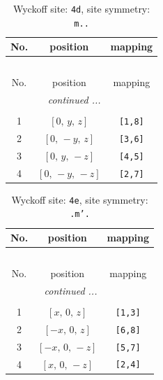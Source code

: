 \documentclass[fleqn,8pt]{jsarticle}
\begin{document}
\begin{longtable}{ccc}
\caption{Wyckoff site: {\tt 4d}, site symmetry: {\tt m..}}
 \\
 \hline \hline
No. & position & mapping \\ \hline \endfirsthead

\multicolumn{2}{l}{\tablename\ \thetable{}} \\
 \hline \hline
No. & position & mapping \\ \hline \endhead

 \hline \hline
\multicolumn{2}{r}{\footnotesize\it continued ...} \\ \endfoot

 \hline \hline
\multicolumn{2}{r}{} \\ \endlastfoot

1 & $\left[ 0,\, y,\, z \right]$ & {\tt [1,8]} \\ \hline
2 & $\left[ 0,\, - y,\, z \right]$ & {\tt [3,6]} \\ \hline
3 & $\left[ 0,\, y,\, - z \right]$ & {\tt [4,5]} \\ \hline
4 & $\left[ 0,\, - y,\, - z \right]$ & {\tt [2,7]} \\
\end{longtable}
\renewcommand{\arraystretch}{1.2}
\begin{longtable}{ccc}
\caption{Wyckoff site: {\tt 4e}, site symmetry: {\tt .m'.}}
 \\
 \hline \hline
No. & position & mapping \\ \hline \endfirsthead

\multicolumn{2}{l}{\tablename\ \thetable{}} \\
 \hline \hline
No. & position & mapping \\ \hline \endhead

 \hline \hline
\multicolumn{2}{r}{\footnotesize\it continued ...} \\ \endfoot

 \hline \hline
\multicolumn{2}{r}{} \\ \endlastfoot

1 & $\left[ x,\, 0,\, z \right]$ & {\tt [1,3]} \\ \hline
2 & $\left[ - x,\, 0,\, z \right]$ & {\tt [6,8]} \\ \hline
3 & $\left[ - x,\, 0,\, - z \right]$ & {\tt [5,7]} \\ \hline
4 & $\left[ x,\, 0,\, - z \right]$ & {\tt [2,4]} \\
\end{longtable}
\renewcommand{\arraystretch}{1.2}
\end{document}
